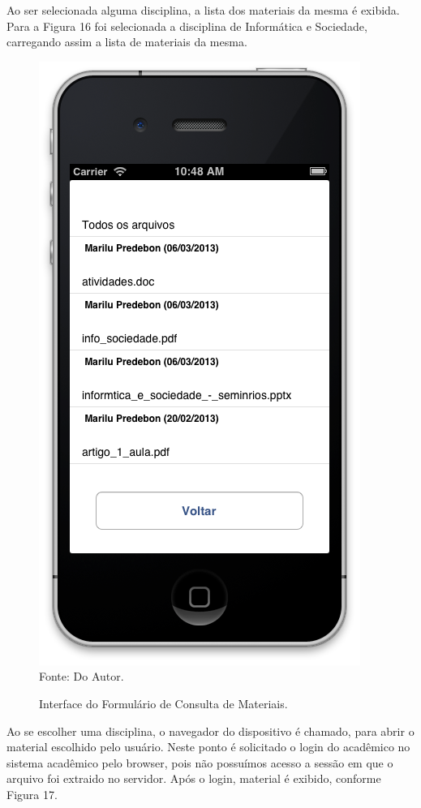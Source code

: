 Ao ser selecionada alguma disciplina, a lista dos materiais da mesma é exibida. Para a Figura 16 foi selecionada a disciplina de Informática e Sociedade, carregando assim a lista de materiais da mesma.

\begin{figure}[!htb]
     \centering
     \caption[Formulário Material de Apoio - Consulta de Materiais]{Interface do Formulário de Consulta de Materiais.}
     \includegraphics[scale=0.34]{imagens/formmaterialdisciplina.png}
     \\  Fonte: Do Autor.
\end{figure}
\newpage

Ao se escolher uma disciplina, o navegador do dispositivo é chamado, para abrir o material escolhido pelo usuário. Neste ponto é solicitado o login do acadêmico no sistema acadêmico pelo browser, pois não possuímos acesso a sessão em que o arquivo foi extraido no servidor. Após o login, material é exibido, conforme Figura 17.


